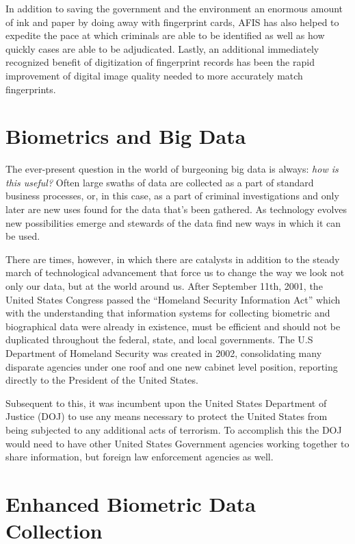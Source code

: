 \documentclass[sigconf]{acmart}
\begin{document}
In addition to saving the government and the environment an enormous amount of ink and paper by doing away with fingerprint cards, AFIS has also helped to expedite the pace at which criminals are able to be identified as well as how quickly cases are able to be adjudicated. Lastly, an additional immediately recognized benefit of digitization of fingerprint records has been the rapid improvement of digital image quality needed to more accurately match fingerprints. 

\section{Biometrics and Big Data}

The ever-present question in the world of burgeoning big data is always: {\em how is this useful?} Often large swaths of data are collected as a part of standard business processes, or, in this case, as a part of criminal investigations and only later are new uses found for the data that's been gathered. As technology evolves new possibilities emerge and stewards of the data find new ways in which it can be used.  

There are times, however, in which there are catalysts in addition to the steady march of technological advancement that force us to change the way we look not only our data, but at the world around us. After September 11th, 2001, the United States Congress passed the ``Homeland Security Information Act'' which with the understanding that information systems for collecting biometric and biographical data were already in existence, must be efficient and should not be duplicated throughout the federal, state, and local governments. The U.S Department of Homeland Security was created in 2002, consolidating many disparate agencies under one roof and one new cabinet level position, reporting directly to the President of the United States.

Subsequent to this, it was incumbent upon the United States Department of Justice (DOJ) to use any means necessary to protect the United States from being subjected to any additional acts of terrorism. To accomplish this the DOJ would need to have other United States Government agencies working together to share information, but foreign law enforcement agencies as well. 

\section{Enhanced Biometric Data Collection}
\end{document}
